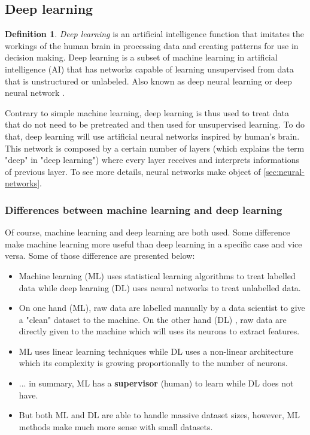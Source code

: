 \documentclass[11pt, openany]{report}
\theoremstyle{plain}
\theoremstyle{definition}
\newtheorem{defn}{Definition}[section]
\theoremstyle{remark}
\begin{document}
\newpage
\subsection{Deep learning}

\begin{defn}
\textit{Deep learning} is an artificial intelligence function that imitates the workings of the human brain in processing data and creating patterns for use in decision making. Deep learning is a subset of machine learning in artificial intelligence (AI) that has networks capable of learning unsupervised from data that is unstructured or unlabeled. Also known as deep neural learning or deep neural network \cite{DL-1}. 
\end{defn}

Contrary to simple machine learning, deep learning is thus used to treat data that do not need to be pretreated and then used for unsupervised learning. To do that, deep learning will use artificial neural networks inspired by human's brain. This network is composed by a certain number of layers (which explains the term "deep" in "deep learning") where every layer receives and interprets informations of previous layer. To see more details, neural networks make object of \autoref{sec:neural-networks}.  

\subsubsection{Differences between machine learning and deep learning}
Of course, machine learning and deep learning are both used. Some difference make machine learning more useful than deep learning in a specific case and vice versa. Some of those difference are presented below: 
\begin{itemize}
\item Machine learning (ML) uses statistical learning algorithms to treat labelled data while deep learning (DL) uses neural networks to treat unlabelled data.
\item On one hand (ML), raw data are labelled manually by a data scientist to give a "clean" dataset to the machine. On the other hand (DL) , raw data are directly given to the machine which will uses its neurons to extract features. 
\item ML uses linear learning techniques while DL uses a non-linear architecture which its complexity is growing proportionally to the number of neurons.   
\item ... in summary, ML has a \textbf{supervisor} (human) to learn while DL does not have. 
\item But both ML and DL are able to handle massive dataset sizes, however, ML methods make much more sense with small datasets. 
\end{itemize} 
 
\end{document}
